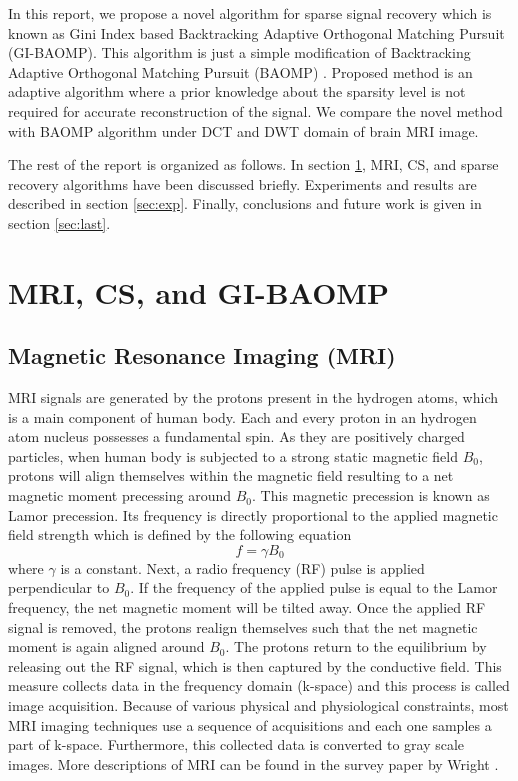 \documentclass[11pt,conference]{IEEEtran}
\begin{document}
\par In this report, we propose a novel algorithm for sparse signal recovery which is known as Gini Index based Backtracking Adaptive Orthogonal Matching Pursuit (GI-BAOMP). This algorithm is just a simple modification of Backtracking Adaptive Orthogonal Matching Pursuit (BAOMP) \cite{baomp}. Proposed method is an adaptive algorithm where a prior knowledge about the sparsity level is not required for accurate reconstruction of the signal. We compare the novel method with BAOMP algorithm under DCT and DWT domain  of brain MRI image.
\par The rest of the report is organized as follows. In section \ref{sec:mr}, MRI, CS, and sparse recovery algorithms have been discussed briefly. Experiments and results are described in section \ref{sec:exp}. Finally, conclusions and future work is given in section \ref{sec:last}. 



\section{MRI, CS, and GI-BAOMP}
\label{sec:mr}
\subsection{Magnetic Resonance Imaging (MRI)}
MRI signals are generated by the protons present in the hydrogen atoms, which is a main component of human body. Each and every proton in an hydrogen atom nucleus possesses a fundamental spin. As they are positively charged particles, when human body is subjected to a strong static magnetic field $B_0$, protons will align themselves within the magnetic field resulting to a net magnetic moment precessing around $B_0$. This magnetic precession is known as Lamor precession. Its frequency is directly proportional to the applied magnetic field strength which is defined by the following equation
\begin{equation}
 f = \gamma B_0
\end{equation}
where $\gamma$ is a constant. Next, a radio frequency (RF) pulse is applied perpendicular to $B_0$. If the frequency of the applied pulse is equal to the Lamor frequency, the net magnetic moment will be tilted away. Once the applied RF signal is removed, the protons realign themselves such that the net magnetic moment is again aligned around $B_0$. The protons return to the equilibrium by releasing out the RF signal, which is then captured by the conductive field. This measure collects data in the frequency domain (k-space) and this process is called image acquisition. Because of various physical and physiological constraints, most MRI imaging techniques use a sequence of acquisitions and each one samples a part of k-space. Furthermore, this collected data is converted to gray scale images. More descriptions of MRI can be found in the survey paper by Wright \cite{wright}.
\end{document}
